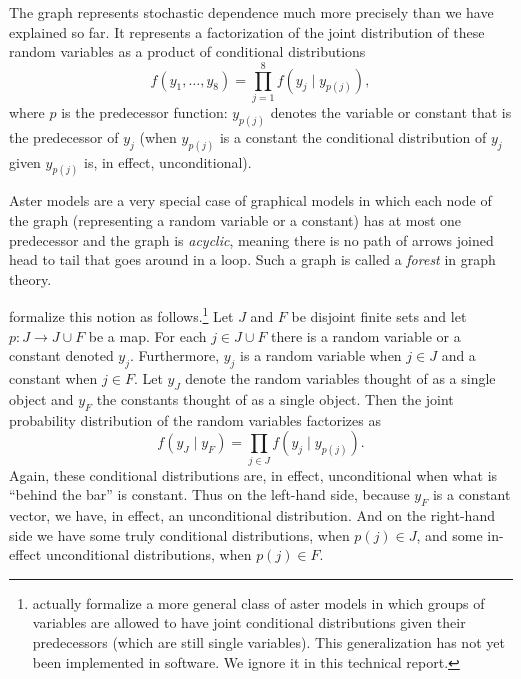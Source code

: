 \documentclass[11pt]{article}
\begin{document}
The graph represents stochastic dependence much more precisely than we have
explained so far.  It represents a factorization of the joint distribution
of these random variables as a product of conditional distributions
\begin{equation} \label{eq:factorize}
   f(y_1, \ldots, y_8) = \prod_{j = 1}^8 f(y_j \mid y_{p(j)}),
\end{equation}
where $p$ is the predecessor function: $y_{p(j)}$ denotes the variable
or constant that is the predecessor of $y_j$ (when $y_{p(j)}$ is a constant
the conditional distribution of $y_j$ given $y_{p(j)}$ is, in effect,
unconditional).


Aster models are a very special case
of graphical models in which each node of the graph (representing a random
variable or a constant) has at most one predecessor and the graph is
\emph{acyclic}, meaning there is no path of arrows joined head to tail that
goes around in a loop.  Such a graph is called
a \emph{forest} in graph theory.

\citet{aster1} formalize this notion as follows.\footnote{\citet{aster1} actually
formalize a more general class of aster models in which groups of variables
are allowed to have joint conditional distributions given their predecessors
(which are still single variables).  This generalization has not yet been
implemented in software.  We ignore it in this
technical report.\label{foot:group}}
Let $J$ and $F$ be disjoint
finite sets and let $p : J \to J \cup F$ be a map.  For each $j \in J \cup F$
there is a random variable or a constant denoted $y_j$.  Furthermore, $y_j$
is a random variable when $j \in J$ and a constant when $j \in F$.  Let $y_J$
denote the random variables thought of as a single object and $y_F$ the
constants thought of as a single object.  Then the joint probability
distribution of the random variables factorizes as
\begin{equation} \label{eq:factorize-too}
   f(y_J \mid y_F) = \prod_{j \in J} f(y_j \mid y_{p(j)}).
\end{equation}
Again, these conditional distributions are, in effect, unconditional when
what is ``behind the bar'' is constant.  Thus on the left-hand side, because
$y_F$ is a constant vector, we have, in effect, an unconditional distribution.
And on the right-hand side we have some truly conditional distributions,
when $p(j) \in J$, and some in-effect unconditional distributions,
when $p(j) \in F$.
\end{document}
